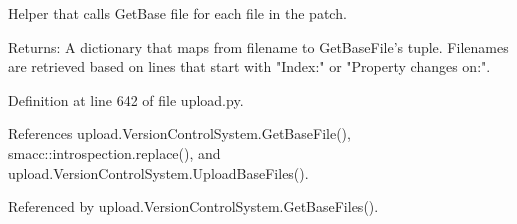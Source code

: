 \begin{DoxyVerb}Helper that calls GetBase file for each file in the patch.

Returns:
  A dictionary that maps from filename to GetBaseFile's tuple.  Filenames
  are retrieved based on lines that start with "Index:" or
  "Property changes on:".
\end{DoxyVerb}
 

Definition at line 642 of file upload.\+py.



References upload.\+Version\+Control\+System.\+Get\+Base\+File(), smacc\+::introspection.\+replace(), and upload.\+Version\+Control\+System.\+Upload\+Base\+Files().



Referenced by upload.\+Version\+Control\+System.\+Get\+Base\+Files().


